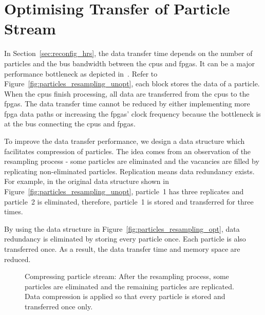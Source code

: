 \section{Optimising Transfer of Particle Stream}
\label{sec:reconfig_stream}

In Section~\ref{sec:reconfig_hrs}, the data transfer time depends on the number of particles and the bus bandwidth between the \glspl{cpu} and \glspl{fpga}.
It can be a major performance bottleneck as depicted in~\cite{chau13arc}.
Refer to Figure~\ref{fig:particles_resampling_unopt}, each block stores the data of a particle.
When the \glspl{cpu} finish processing, all data are transferred from the \glspl{cpu} to the \glspl{fpga}.
The data transfer time cannot be reduced by either implementing more \gls{fpga} data paths or increasing the \glspl{fpga}' clock frequency because the bottleneck is at the bus connecting the \glspl{cpu} and \glspl{fpga}.

To improve the data transfer performance, we design a data structure which facilitates compression of particles.
The idea comes from an observation of the resampling process - some particles are eliminated and the vacancies are filled by replicating non-eliminated particles.
Replication means data redundancy exists.
For example, in the original data structure shown in Figure~\ref{fig:particles_resampling_unopt}, 
particle~1 has three replicates and particle~2 is eliminated, therefore, particle~1 is stored and transferred for three times.

By using the data structure in Figure~\ref{fig:particles_resampling_opt}, data redundancy is eliminated by storing every particle once.
Each particle is also transferred once.
As a result, the data transfer time and memory space are reduced.

\setcounter{subfigure}{0}
\begin{figure}[t!]
\centering
{}
\caption{Compressing particle stream: After the resampling process, some particles are eliminated and the remaining particles are replicated. Data compression is applied so that every particle is stored and transferred once only.}
\label{fig:particles_resampling}
\end{figure}

